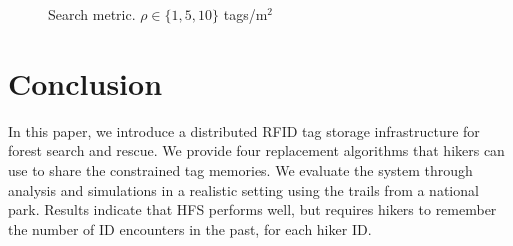\documentclass[conference]{IEEEtran}
\begin{document}
\begin{figure}
\centering
\caption{Search metric. $\rho \in \{1, 5, 10\}$ tags/m$^2$}
\label{fig:search}
\end{figure}


\section{Conclusion}
\label{sec:conclusion}
In this paper, we introduce a distributed RFID tag storage infrastructure for forest search and rescue.  We provide four replacement algorithms that hikers can use to share the constrained tag memories.  We evaluate the system through analysis and simulations in a realistic setting using the trails from a national park.  Results indicate that HFS performs well, but requires hikers to remember the number of ID encounters in the past, for each hiker ID.
\end{document}
